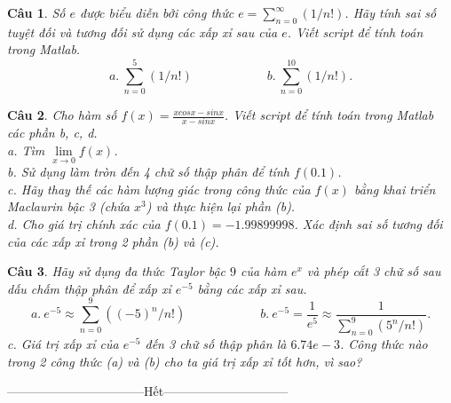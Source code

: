 \documentclass[answers]{exam}
\newtheorem{bt}{Câu}
\begin{document}
\begin{bt}
Số $e$ được biểu diễn bởi công thức $e = \sum_{n=0}^{\infty}(1/n!)$. Hãy tính sai số tuyệt đối và tương đối sử dụng các xấp xỉ sau của $e$. Viết script để tính toán trong Matlab.
%
\[ 
a. \ \sum_{n=0}^{5}(1/n!) \qquad \qquad \qquad b. \ \sum_{n=0}^{10}(1/n!).
\] 
%
\end{bt}

\begin{bt}
Cho hàm số $f(x) = \frac{x cos x - sin x}{x - sin x}$. Viết script để tính toán trong Matlab các phần b, c, d.\\
a. Tìm $\underset{x \rightarrow 0}{\lim} f(x)$. \\
b. Sử dụng làm tròn đến 4 chữ số thập phân để tính $f(0.1)$. \\
c. Hãy thay thế các hàm lượng giác trong công thức của $f(x)$ bằng khai triển Maclaurin bậc 3 (chứa $x^3$) và thực hiện lại phần (b). \\
d. Cho giá trị chính xác của $f (0.1)=-1.99899998$. Xác định sai số tương đối của các xấp xỉ trong 2 phần (b) và (c).	
\end{bt}

\begin{bt}
Hãy sử dụng đa thức Taylor bậc $9$ của hàm $e^x$ và phép cắt 3 chữ số sau dấu chấm thập phân để xấp xỉ $e^{-5}$ bằng các xấp xỉ sau.
%
\[
a.\ e^{-5} \approx \sum_{n=0}^{9}((-5)^n/n!) \qquad \qquad \qquad b.\ e^{-5} = \frac{1}{e^5} \approx \frac{1}{\sum_{n=0}^{9}(5^n/n!)}. 
\]
%
c. Giá trị xấp xỉ của $e^{-5}$ đến 3 chữ số thập phân là $6.74e-3$. Công thức nào trong 2 công thức (a) và (b) cho ta giá trị xấp xỉ tốt hơn, vì sao?
\end{bt}

\centerline{———————————Hết——————————}

% 
   
\end{document}
